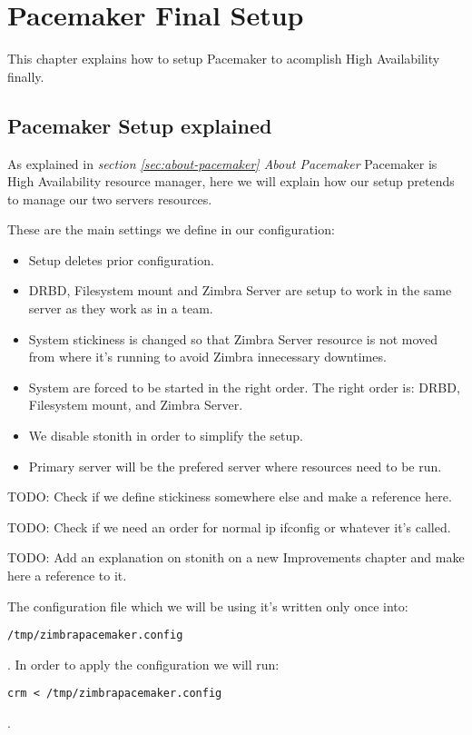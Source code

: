 

\chapter{Pacemaker Final Setup}
\label{chap:pacemaker-final-setup}
This chapter explains how to setup Pacemaker to acomplish High Availability finally.

\section {Pacemaker Setup explained}
As explained in \textit{section \ref{sec:about-pacemaker} About Pacemaker} Pacemaker is High Availability resource manager, here we will explain how our setup pretends to manage our two servers resources.

These are the main settings we define in our configuration:
\begin{itemize}
  \item Setup deletes prior configuration.
  \item DRBD, Filesystem mount and Zimbra Server are setup to work in the same server as they work as in a team.
  \item System stickiness is changed so that Zimbra Server resource is not moved from where it's running to avoid Zimbra innecessary downtimes.
  \item System are forced to be started in the right order. The right order is: DRBD, Filesystem mount, and Zimbra Server.
  \item We disable stonith in order to simplify the setup.
  \item Primary server will be the prefered server where resources need to be run.
\end{itemize}

TODO: Check if we define stickiness somewhere else and make a reference here.

TODO: Check if we need an order for normal ip ifconfig or whatever it's called.

TODO: Add an explanation on stonith on a new Improvements chapter and make here a reference to it.



The configuration file which we will be using it's written only once into:
\begin{verbatim}
/tmp/zimbrapacemaker.config
\end{verbatim}
. In order to apply the configuration we will run:
\begin{verbatim}
crm < /tmp/zimbrapacemaker.config
\end{verbatim}
.

